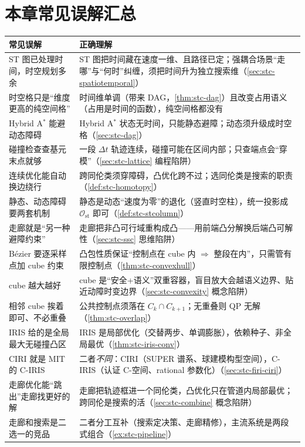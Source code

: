 \section*{本章常见误解汇总}
\begin{table}[H]\centering\small
\begin{tabular}{p{} p{}}
\toprule
\textbf{常见误解} & \textbf{正确理解} \\
\midrule
ST 图已处理时间，时空规划多余 & ST 图把时间藏在速度一维、且路径已定；强耦合场景“走哪”与“何时”纠缠，须把时间升为独立搜索维（\cref{sec:stc-spatiotemporal}）\\
时空格只是“维度更高的纯空间格” & 时间维单调（带来 DAG，\cref{thm:stc-dag}）且改变占用语义（占用是时间的函数），纯空间格都没有 \\
Hybrid A$^*$ 能避动态障碍 & Hybrid A$^*$ 状态无时间，只能静态避障；动态须升级成时空格（\cref{sec:stc-dag}）\\
碰撞检查查基元末点就够 & 一段 $\Delta t$ 轨迹连续，碰撞可能在区间内部；只查端点会“穿模”（\cref{sec:stc-lattice} 编程陷阱）\\
连续优化能自动换边绕行 & 跨同伦类须穿障碍，凸优化跨不过；选同伦类是搜索的职责（\cref{def:stc-homotopy}）\\
静态、动态障碍要两套机制 & 静态是动态“速度为零”的退化（竖直时空柱），统一投影成 $\mathcal{O}_{\mathrm{st}}$ 即可（\cref{def:stc-stcolumn}）\\
走廊就是“另一种避障约束” & 走廊把非凸可行域重构成凸——用前端凸分解换后端凸可解性（\cref{sec:stc-ssc} 思维陷阱）\\
Bézier 要逐采样点加 cube 约束 & 凸包性质保证“控制点在 cube 内 $\Rightarrow$ 整段在内”，只需管有限控制点（\cref{thm:stc-convexhull}）\\
cube 越大越好 & cube 是“安全+语义”双重容器，盲目放大会越语义边界、贴近动障时变边界（\cref{sec:stc-convexity} 概念陷阱）\\
相邻 cube 挨着即可、不必重叠 & 公共控制点须落在 $C_k\cap C_{k+1}$；无重叠则 QP 无解（\cref{thm:stc-overlap}）\\
IRIS 给的是全局最大无碰撞凸区 & IRIS 是局部优化（交替两步、单调膨胀），依赖种子、非全局最优（\cref{thm:stc-iris-conv}）\\
CIRI 就是 MIT 的 C-IRIS & 二者\emph{不同}：CIRI（SUPER 谱系、球建模构型空间），C-IRIS（认证 C-空间、rational 参数化）（\cref{sec:stc-firi-ciri}）\\
走廊优化能“跳出”走廊找更好的解 & 走廊把轨迹框进一个同伦类，凸优化只在管道内局部最优；跨同伦是搜索的活（\cref{sec:stc-combine} 概念陷阱）\\
走廊和搜索是二选一的竞品 & 二者分工互补（搜索定决策、走廊精修），主流系统是两段式组合（\cref{ex:stc-pipeline}）\\
\bottomrule
\end{tabular}
\end{table}

